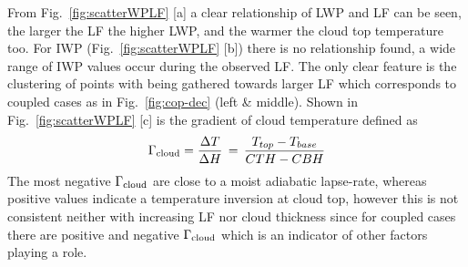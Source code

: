 \documentclass[portrate,a0paper,fontscale=0.45,margin=1cm]{baposter}
\begin{document}
\begin{poster}
{From Fig.~\ref{fig:scatterWPLF} [a] a clear relationship of LWP and LF can be seen, the larger the LF the higher LWP, and the warmer the cloud top temperature too. For IWP (Fig.~\ref{fig:scatterWPLF} [b]) there is no relationship found, a wide range of IWP values occur during the observed LF. The only clear feature is the clustering of points with being gathered towards larger LF which corresponds to coupled cases as in Fig.~\ref{fig:cop-dec} (left \& middle). Shown in Fig.~\ref{fig:scatterWPLF} [c] is the gradient of cloud temperature defined as
\begin{equation}
	\Gamma_{\rm cloud}=\frac{\Delta T}{\Delta H}\,=\,\frac{T_{top}-T_{base}}{CTH-CBH}
	\label{eq:lapserate}
\end{equation}
 The most negative $\Gamma_{\rm cloud}$ are close to a moist adiabatic lapse-rate, whereas positive values indicate a temperature inversion at cloud top, however this is not consistent neither with increasing LF nor cloud thickness since for coupled cases there are positive and negative $\Gamma_{\rm cloud}$ which is an indicator of other factors playing a role.
   
}


\end{poster}
\end{document}
